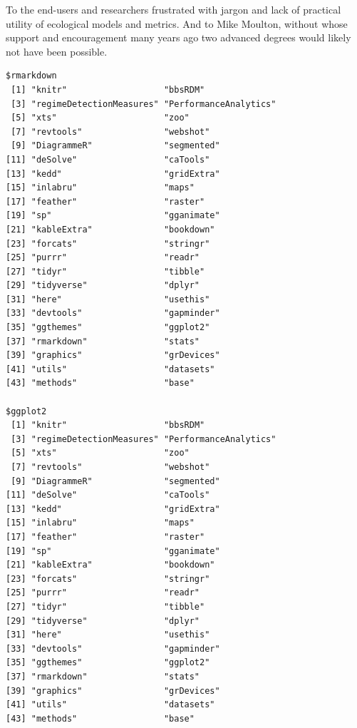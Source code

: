 \documentclass[12pt,twoside,openany]{reedthesis}
\begin{document}
  \begin{dedication}
    To the end-users and researchers frustrated with jargon and lack of practical utility of ecological models and metrics. And to Mike Moulton, without whose support and encouragement many years ago two advanced degrees would likely not have been possible.
  \end{dedication}
\mainmatter %
\pagestyle{fancyplain} %
\doublespacing{} %
\begin{verbatim}
$rmarkdown
 [1] "knitr"                   "bbsRDM"                 
 [3] "regimeDetectionMeasures" "PerformanceAnalytics"   
 [5] "xts"                     "zoo"                    
 [7] "revtools"                "webshot"                
 [9] "DiagrammeR"              "segmented"              
[11] "deSolve"                 "caTools"                
[13] "kedd"                    "gridExtra"              
[15] "inlabru"                 "maps"                   
[17] "feather"                 "raster"                 
[19] "sp"                      "gganimate"              
[21] "kableExtra"              "bookdown"               
[23] "forcats"                 "stringr"                
[25] "purrr"                   "readr"                  
[27] "tidyr"                   "tibble"                 
[29] "tidyverse"               "dplyr"                  
[31] "here"                    "usethis"                
[33] "devtools"                "gapminder"              
[35] "ggthemes"                "ggplot2"                
[37] "rmarkdown"               "stats"                  
[39] "graphics"                "grDevices"              
[41] "utils"                   "datasets"               
[43] "methods"                 "base"                   

$ggplot2
 [1] "knitr"                   "bbsRDM"                 
 [3] "regimeDetectionMeasures" "PerformanceAnalytics"   
 [5] "xts"                     "zoo"                    
 [7] "revtools"                "webshot"                
 [9] "DiagrammeR"              "segmented"              
[11] "deSolve"                 "caTools"                
[13] "kedd"                    "gridExtra"              
[15] "inlabru"                 "maps"                   
[17] "feather"                 "raster"                 
[19] "sp"                      "gganimate"              
[21] "kableExtra"              "bookdown"               
[23] "forcats"                 "stringr"                
[25] "purrr"                   "readr"                  
[27] "tidyr"                   "tibble"                 
[29] "tidyverse"               "dplyr"                  
[31] "here"                    "usethis"                
[33] "devtools"                "gapminder"              
[35] "ggthemes"                "ggplot2"                
[37] "rmarkdown"               "stats"                  
[39] "graphics"                "grDevices"              
[41] "utils"                   "datasets"               
[43] "methods"                 "base"                   


\end{verbatim}
\end{document}
